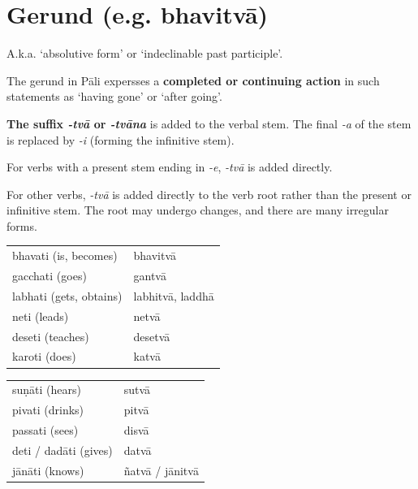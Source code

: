 \documentclass[11pt,oneside]{memoir}
\begin{document}
\normalArrayStrech

\clearpage

\section{Gerund (e.g. bhavitvā)}
\label{sec:org5f3d8bf}

A.k.a. `absolutive form' or `indeclinable past participle'.

The gerund in Pāli expersses a \textbf{completed or continuing action} in such statements as `having gone' or `after going'.

\textbf{The suffix \emph{-tvā} or \emph{-tvāna}} is added to the verbal stem. The final \emph{-a} of the
stem is replaced by \emph{-i} (forming the infinitive stem).

For verbs with a present stem ending in \emph{-e}, \emph{-tvā} is added directly.

For other verbs, \emph{-tvā} is added directly to the verb root rather than the
present or infinitive stem. The root may undergo changes, and there are many
irregular forms.

\bigskip
\begin{multicols}{2}

\begin{center}
\begin{tabular}{ll}
bhavati (is, becomes) & bhavitvā\\[0pt]
gacchati (goes) & gantvā\\[0pt]
labhati (gets, obtains) & labhitvā, laddhā\\[0pt]
neti (leads) & netvā\\[0pt]
deseti (teaches) & desetvā\\[0pt]
karoti (does) & katvā\\[0pt]
\end{tabular}
\end{center}

\columnbreak

\begin{center}
\begin{tabular}{ll}
suṇāti (hears) & sutvā\\[0pt]
pivati (drinks) & pitvā\\[0pt]
passati (sees) & disvā\\[0pt]
deti / dadāti (gives) & datvā\\[0pt]
jānāti (knows) & ñatvā / jānitvā\\[0pt]
\end{tabular}
\end{center}

\end{multicols}
\end{document}
